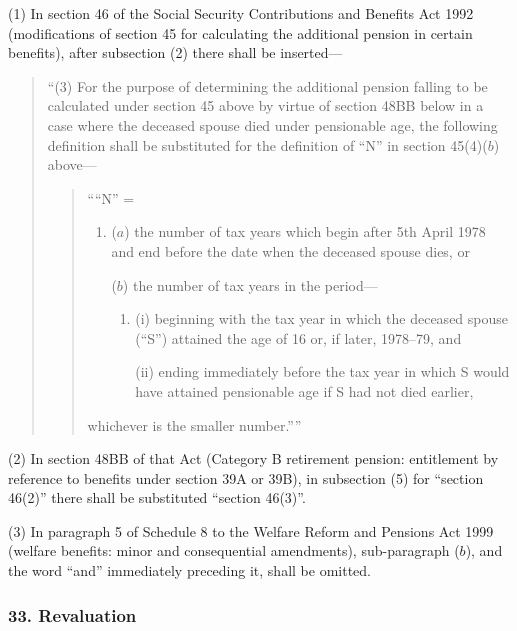 \documentclass[12pt,a4paper]{article}
\begin{document}
(1) In section 46 of the Social Security Contributions and Benefits Act 1992 (modifications of section 45 for calculating the additional pension in certain benefits), after subsection (2)  there shall be inserted—
\begin{quotation}
“(3) For the purpose of determining the additional pension falling to be calculated under section 45 above by virtue of section 48BB below in a case where the deceased spouse died under pensionable age, the following definition shall be substituted for the definition of “N” in section 45(4)($b$)  above—
\begin{quotation}
    ““N” =
\begin{enumerate}\item[]
    ($a$) 
    the number of tax years which begin after 5th April 1978 and end before the date when the deceased spouse dies, or

    ($b$) 
    the number of tax years in the period—
\begin{enumerate}\item[]
    (i) 
    beginning with the tax year in which the deceased spouse (“S”) attained the age of 16 or, if later, 1978--79, and

    (ii) 
    ending immediately before the tax year in which S would have attained pensionable age if S had not died earlier,
\end{enumerate}
\end{enumerate}
    whichever is the smaller number.”” 
\end{quotation}
\end{quotation}

(2) In section 48BB of that Act (Category B retirement pension: entitlement by reference to benefits under section 39A or 39B), in subsection (5)  for “section 46(2)” there shall be substituted “section 46(3)”.

(3) In paragraph 5 of Schedule 8 to the Welfare Reform and Pensions Act 1999 (welfare benefits: minor and consequential amendments), sub-paragraph ($b$), and the word “and” immediately preceding it, shall be omitted.

\subsubsection{33. Revaluation}
\end{document}
